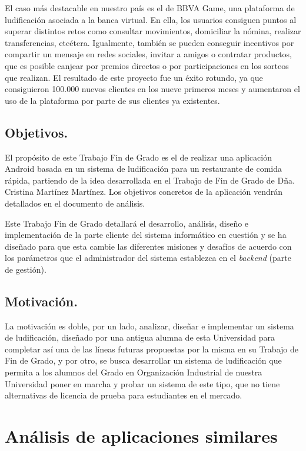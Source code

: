 \documentclass[twoside]{report}
\begin{document}
El caso más destacable en nuestro país es el de \cite{bbvag} BBVA Game, una plataforma de ludificación asociada a la banca virtual. En ella, los usuarios consiguen puntos al superar distintos retos como consultar movimientos, domiciliar la nómina, realizar transferencias, etcétera. Igualmente, también se pueden conseguir incentivos por compartir un mensaje en redes sociales,  invitar a amigos o contratar productos, que es posible canjear por premios directos o por participaciones en los sorteos que realizan. El resultado de este proyecto fue un éxito rotundo, ya que consiguieron 100.000 nuevos clientes en los nueve primeros meses y aumentaron el uso de la plataforma por parte de sus clientes ya existentes.

\subsection{Objetivos.}

El propósito de este Trabajo Fin de Grado es el de realizar una aplicación Android basada en un sistema de ludificación para un restaurante de comida rápida, partiendo de la idea desarrollada en el \cite{cristinatfg} Trabajo de Fin de Grado de Dña. Cristina Martínez Martínez. Los objetivos concretos de la aplicación vendrán detallados en el documento de análisis.

Este Trabajo Fin de Grado detallará el desarrollo, análisis, diseño e implementación de la parte cliente del sistema informático en cuestión y se ha diseñado para que esta cambie las diferentes misiones y desafíos de acuerdo con los parámetros que el administrador del sistema establezca en el \textit{backend} (parte de gestión).

\subsection{Motivación.}

La motivación es doble, por un lado, analizar, diseñar e implementar un sistema de ludificación, diseñado por una antigua alumna de esta Universidad para completar así una de las líneas futuras propuestas por la misma en su Trabajo de Fin de Grado, y por otro, se busca desarrollar un sistema de ludificación que permita a los alumnos del Grado en Organización Industrial de nuestra Universidad poner en marcha y probar un sistema de este tipo, que no tiene alternativas de licencia de prueba para estudiantes en el mercado.

\section{Análisis de aplicaciones similares}
\end{document}
